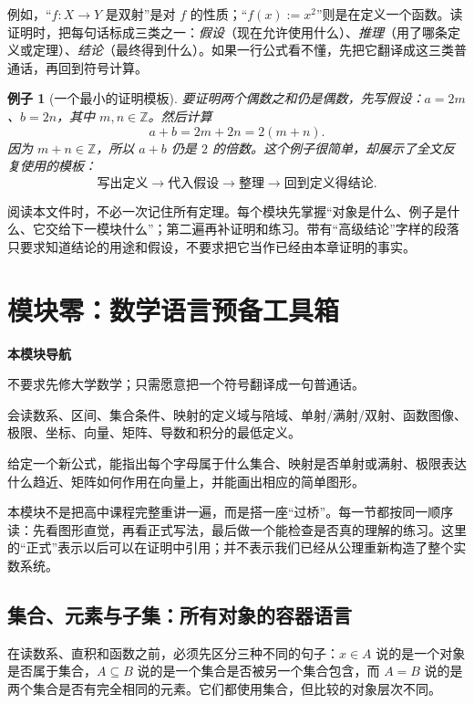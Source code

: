 \documentclass[UTF8,fontset=none,a4paper,11pt]{ctexart}
\theoremstyle{foundation-definition}
\theoremstyle{foundation-theorem}
\theoremstyle{foundation-proposition}
\theoremstyle{foundation-example}
\newtheorem{example}[definition]{例子}
\theoremstyle{foundation-remark}
\theoremstyle{foundation-theorem}
\newcommand{\moduleguide}[3]{%
\begin{mdframed}[backgroundcolor=definitionbg,linecolor=mainblue,linewidth=1.5pt,
  leftline=true,rightline=false,topline=false,bottomline=false,
  skipabove=9pt,skipbelow=10pt,innerleftmargin=10pt,innerrightmargin=8pt,
  innertopmargin=7pt,innerbottommargin=7pt]
{\sffamily\bfseries\color{mainblue}本模块导航}\par\smallskip
\begin{description}[style=nextline,leftmargin=2.8cm]
  \item[进入前] #1
  \item[本模块产出] #2
  \item[出口检查] #3
\end{description}
\end{mdframed}}
\begin{document}
例如，“\(f:X\to Y\) 是双射”是对 \(f\) 的性质；“\(f(x):=x^2\)”则是在定义一个函数。读证明时，把每句话标成三类之一：\emph{假设}（现在允许使用什么）、\emph{推理}（用了哪条定义或定理）、\emph{结论}（最终得到什么）。如果一行公式看不懂，先把它翻译成这三类普通话，再回到符号计算。

\begin{example}[一个最小的证明模板]
要证明两个偶数之和仍是偶数，先写假设：\(a=2m\)、\(b=2n\)，其中 \(m,n\in\mathbb Z\)。然后计算
\[
a+b=2m+2n=2(m+n).
\]
因为 \(m+n\in\mathbb Z\)，所以 \(a+b\) 仍是 \(2\) 的倍数。这个例子很简单，却展示了全文反复使用的模板：
\[
\text{写出定义}\longrightarrow\text{代入假设}\longrightarrow\text{整理}\longrightarrow\text{回到定义得结论}.
\]
\end{example}

阅读本文件时，不必一次记住所有定理。每个模块先掌握“对象是什么、例子是什么、它交给下一模块什么”；第二遍再补证明和练习。带有“高级结论”字样的段落只要求知道结论的用途和假设，不要求把它当作已经由本章证明的事实。

\clearpage
\section{模块零：数学语言预备工具箱}

\moduleguide{不要求先修大学数学；只需愿意把一个符号翻译成一句普通话。}{会读数系、区间、集合条件、映射的定义域与陪域、单射/满射/双射、函数图像、极限、坐标、向量、矩阵、导数和积分的最低定义。}{给定一个新公式，能指出每个字母属于什么集合、映射是否单射或满射、极限表达什么趋近、矩阵如何作用在向量上，并能画出相应的简单图形。}

本模块不是把高中课程完整重讲一遍，而是搭一座“过桥”。每一节都按同一顺序读：先看图形直觉，再看正式写法，最后做一个能检查是否真的理解的练习。这里的“正式”表示以后可以在证明中引用；并不表示我们已经从公理重新构造了整个实数系统。

\subsection{集合、元素与子集：所有对象的容器语言}

在读数系、直积和函数之前，必须先区分三种不同的句子：\(x\in A\) 说的是一个对象是否属于集合，\(A\subseteq B\) 说的是一个集合是否被另一个集合包含，而 \(A=B\) 说的是两个集合是否有完全相同的元素。它们都使用集合，但比较的对象层次不同。
\end{document}
